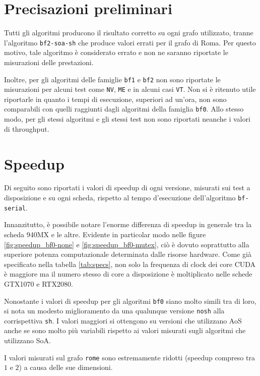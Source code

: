 \documentclass[12pt,a4paper,oneside]{book}
\begin{document}
	\section{Precisazioni preliminari}
	Tutti gli algoritmi producono il risultato corretto su ogni grafo utilizzato, tranne l'algoritmo \texttt{bf2-soa-sh} che produce valori errati per il grafo di Roma. Per questo motivo, tale algoritmo è considerato errato e non ne saranno riportate le misurazioni delle prestazioni.
	
	Inoltre, per gli algoritmi delle famiglie \texttt{bf1} e \texttt{bf2} non sono riportate le misurazioni per alcuni test come \texttt{NV}, \texttt{ME} e in alcuni casi \texttt{VT}. Non si è ritenuto utile riportarle in quanto i tempi di esecuzione, superiori ad un'ora, non sono comparabili con quelli raggiunti dagli algoritmi della famiglia \texttt{bf0}. Allo stesso modo, per gli stessi algoritmi e gli stessi test non sono riportati neanche i valori di throughput.
	
	\section{Speedup}
	Di seguito sono riportati i valori di speedup di ogni versione, misurati sui test a disposizione e su ogni scheda, rispetto al tempo d'esecuzione dell'algoritmo \texttt{bf-serial}.
	
	Innanzitutto, è possibile notare l'enorme differenza di speedup in generale tra la scheda 940MX e le altre. Evidente in particolar modo nelle figure \ref{fig:speedup_bf0-none} e \ref{fig:speedup_bf0-mutex}, ciò è dovuto soprattutto alla superiore potenza computazionale determinata dalle risorse hardware. Come già specificato nella tabella \ref{tab:specs}, non solo la frequenza di clock dei core CUDA è maggiore ma il numero stesso di core a disposizione è moltiplicato nelle schede GTX1070 e RTX2080.
	
	Nonostante i valori di speedup per gli algoritmi \texttt{bf0} siano molto simili tra di loro, si nota un modesto miglioramento da una qualunque versione \texttt{nosh} alla corrispettiva \texttt{sh}. I valori maggiori si ottengono su versioni che utilizzano AoS anche se sono molto più variabili rispetto ai valori misurati sugli algoritmi che utilizzano SoA.
	
	I valori misurati sul grafo \texttt{rome} sono estremamente ridotti (speedup compreso tra $1$ e $2$) a causa delle sue dimensioni.
	
\end{document}
